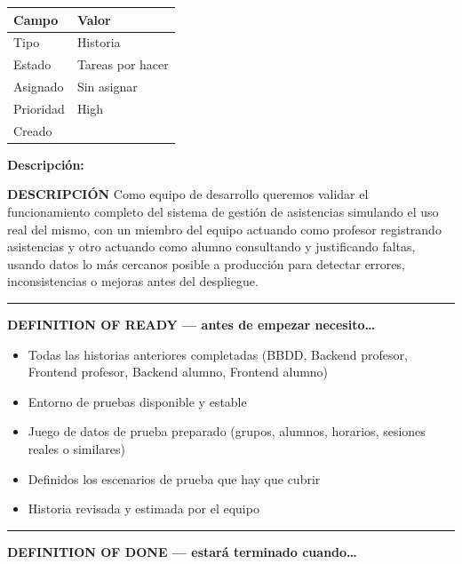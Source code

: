 \documentclass[
  spanish,
  11pt,
]{report}
\newcounter{none} %
\providecommand{\tightlist}{%
  \setlength{\itemsep}{0pt}\setlength{\parskip}{0pt}}
\begin{document}
{\def\LTcaptype{none} %
\begin{longtable}[]{@{}ll@{}}
\toprule\noalign{}
Campo & Valor \\
\midrule\noalign{}
\endhead
\bottomrule\noalign{}
\endlastfoot
Tipo & Historia \\
Estado & Tareas por hacer \\
Asignado & Sin asignar \\
Prioridad & High \\
Creado & \\
\end{longtable}
}

\textbf{Descripción:}

\textbf{DESCRIPCIÓN} Como equipo de desarrollo queremos validar el
funcionamiento completo del sistema de gestión de asistencias simulando
el uso real del mismo, con un miembro del equipo actuando como profesor
registrando asistencias y otro actuando como alumno consultando y
justificando faltas, usando datos lo más cercanos posible a producción
para detectar errores, inconsistencias o mejoras antes del despliegue.

\begin{center}\rule{0.5\linewidth}{0.5pt}\end{center}

\textbf{DEFINITION OF READY --- antes de empezar necesito\ldots{}}

\begin{itemize}
\tightlist
\item
  Todas las historias anteriores completadas (BBDD, Backend profesor,
  Frontend profesor, Backend alumno, Frontend alumno)
\item
  Entorno de pruebas disponible y estable
\item
  Juego de datos de prueba preparado (grupos, alumnos, horarios,
  sesiones reales o similares)
\item
  Definidos los escenarios de prueba que hay que cubrir
\item
  Historia revisada y estimada por el equipo
\end{itemize}

\begin{center}\rule{0.5\linewidth}{0.5pt}\end{center}

\textbf{DEFINITION OF DONE --- estará terminado cuando\ldots{}}
\end{document}
